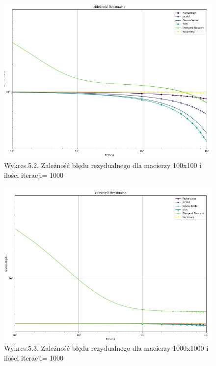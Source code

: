 \documentclass{article}
\begin{document}
\begin{figure}[H]
  \includegraphics[width=1.5\textwidth, center]{Rezco100.png}
  \centering
  \captionsetup[Tabela]{name=New Table Name}
  \caption*{Wykres.5.2. Zależność błędu rezydualnego dla macierzy 100x100 i ilości iteracji= 1000}
\end{figure}
\begin{figure}[H]
  \includegraphics[width=1.5\textwidth, center]{Rezco1000.png}
  \centering
  \captionsetup[Tabela]{name=New Table Name}
  \caption*{Wykres.5.3. Zależność błędu rezydualnego dla macierzy 1000x1000 i ilości iteracji= 1000}
\end{figure}
\end{document}
